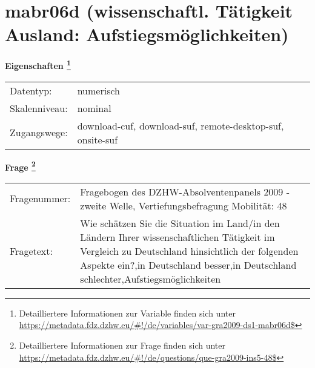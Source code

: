 
    \setcounter{footnote}{0}

    \vspace*{-1.8cm}
	\section{mabr06d (wissenschaftl. Tätigkeit Ausland: Aufstiegsmöglichkeiten)}
	\label{section:mabr06d}



    \vspace*{0.5cm}
    \noindent\textbf{Eigenschaften
	\footnote{Detailliertere Informationen zur Variable finden sich unter
		\url{https://metadata.fdz.dzhw.eu/\#!/de/variables/var-gra2009-ds1-mabr06d$}}}\\
	\begin{tabularx}{\hsize}{@{}lX}
	Datentyp: & numerisch \\
	Skalenniveau: & nominal \\
	Zugangswege: &
	  download-cuf, 
	  download-suf, 
	  remote-desktop-suf, 
	  onsite-suf
 \\
    \end{tabularx}



				\vspace*{0.5cm}
                \noindent\textbf{Frage
	                \footnote{Detailliertere Informationen zur Frage finden sich unter
		              \url{https://metadata.fdz.dzhw.eu/\#!/de/questions/que-gra2009-ins5-48$}}}\\
				\begin{tabularx}{\hsize}{@{}lX}
					Fragenummer: &
					  Fragebogen des DZHW-Absolventenpanels 2009 - zweite Welle, Vertiefungsbefragung Mobilität:
					  48
 \\
					Fragetext: & Wie schätzen Sie die Situation im Land/in den Ländern Ihrer wissenschaftlichen Tätigkeit im Vergleich zu Deutschland hinsichtlich der folgenden Aspekte ein?,in Deutschland besser,in Deutschland schlechter,Aufstiegsmöglichkeiten \\
				\end{tabularx}





